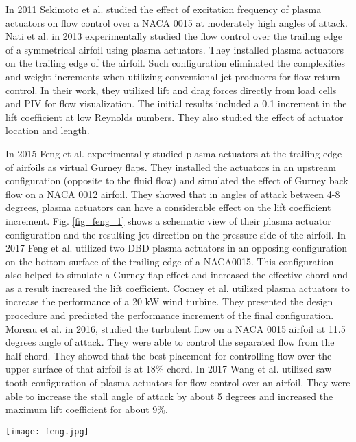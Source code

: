 \documentclass[fleqn,10pt]{SelfArx} %
\begin{document}
In 2011 Sekimoto et al. \cite{sekimoto2011experimental} studied the effect of excitation frequency of plasma actuators on flow control over a NACA 0015 at moderately high angles of attack. Nati et al. \cite{nati2013control} in 2013 experimentally studied the flow control over the trailing edge of a symmetrical airfoil using plasma actuators. They installed plasma actuators on the trailing edge of the airfoil. Such configuration eliminated the complexities and weight increments when utilizing conventional jet producers for flow return control. In their work, they utilized lift and drag forces directly from load cells and PIV for flow visualization. The initial results included a 0.1 increment in the lift coefficient at low Reynolds numbers. They also studied the effect of actuator location and length.

In 2015 Feng et al. \cite{feng2015flow} experimentally studied plasma actuators at the trailing edge of airfoils as virtual Gurney flaps. They installed the actuators in an upstream configuration (opposite to the fluid flow) and simulated the effect of Gurney back flow on a NACA 0012 airfoil. They showed that in angles of attack between 4-8 degrees, plasma actuators can have a considerable effect on the lift coefficient increment. Fig. \ref{fig_feng_1} shows a schematic view of their plasma actuator configuration and the resulting jet direction on the pressure side of the airfoil. In 2017 Feng et al. \cite{feng2017lift} utilized two DBD plasma actuators in an opposing configuration on the bottom surface of the trailing edge of a NACA0015. This configuration also helped to simulate a Gurney flap effect and increased the effective chord and as a result increased the lift coefficient. Cooney et al. \cite{cooney2016development} utilized plasma actuators to increase the performance of a 20 kW wind turbine. They presented the design procedure and predicted the performance increment of the final configuration.  Moreau et al. \cite{moreau2016control} in 2016, studied the turbulent flow on a NACA 0015 airfoil at 11.5 degrees angle of attack. They were able to control the separated flow from the half chord. They showed that the best placement for controlling flow over the upper surface of that airfoil is at 18\% chord. In 2017 Wang et al. \cite{wang2017novel} utilized saw tooth configuration of plasma actuators for flow control over an airfoil. They were able to increase the stall angle of attack by about 5 degrees and increased the maximum lift coefficient for about 9\%.
\begin{figure*}[ht]\centering
\texttt{[image: feng.jpg]}
\caption{Plasma actuator configuration on NACA 0012 airfoil \cite{feng2015flow}.}
\label{fig_feng_1}
\end{figure*}
\end{document}
